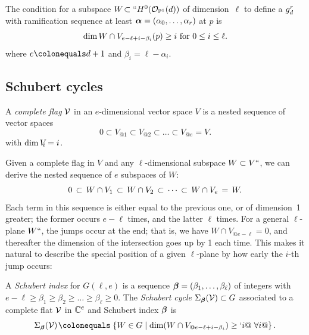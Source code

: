 \begin{proposition}\label{ramification1}
\!The condition for a subspace $W\!\subset``H^{0}(\sO_{\PP^{1}}(d))\mskip1mu$
of dimension~$\ell$
to define a $\grd$ with ramification sequence at least $\balpha
=(\alpha_{0},\dots, \alpha_{r})$ at $p$ is
$$
\dim W\cap V_{e-\ell+i-\beta_{i}}(p)\geq  i \hbox{ for } 0\leq i \leq
\ell.
$$
where $e\colonequals d+1$ and $\beta_{i} = \ell-\alpha_{i}$.
\end{proposition}

\subsection*{Schubert cycles}

\begin{definition}
A \emph{complete flag} $\cal V$  in an $e$-dimensional vector space $V$
%
is a nested sequence of vector spaces
$$
0 \subset V_{@1} \subset V_{@2} \subset \dots  \subset V_{@e} = V.
$$
with $\dim V_{\mskip-5mu i} = i$.
\end{definition}

Given a complete flag
in $V$ and any  $\ell$-dimensional subspace
$W \subset V` `$, we can derive the nested sequence of $e$ subspaces of $W$:
$$
\let\;\,
0 \; \subset \; W \cap V_1 \; \subset \;  W \cap V_2 \; \subset \;
\cdots \; \subset \;  W \cap V_{e} \,=\, W
.
$$
Each term in this sequence is either equal to the
previous
one, or of
dimension~1 greater; the former  occurs $e-\ell$ times, and the latter
$\ell$ times. For a general $\ell $-plane $W` `$, the jumps occur
at the end; that is, we have $W \cap V_{@e-\ell} = 0$, and thereafter
the dimension of the intersection goes up by 1 each time. This makes
it natural
to describe the special position of a given $\ell $-plane by how early
the $i$-th jump occurs:

\begin{definition}
A \emph{Schubert index} for $G(\ell, e)$ is a sequence ${\bbeta} =
(\beta_1,\dots,\beta_{\ell})$ of integers with $e-\ell \geq \beta_1 \geq
\beta_2 \geq \dots \geq \beta_{\ell} \geq 0$.
The \emph{Schubert cycle $\Sigma_{\bbeta}({\cal V}) \subset G$} associated
\label{Schubert1}
to a complete flat $\sV$ in $\CC^e$ and
Schubert index $\bbeta$  is
$$
\Sigma_{\bbeta}({\cal V}) \; \colonequals  \; \left\{ W \in G \mid \dim(W
\cap V_{@e-\ell+i-\beta_i}) \geq `i @\  \forall i@\right\} .
$$
\end{definition}

